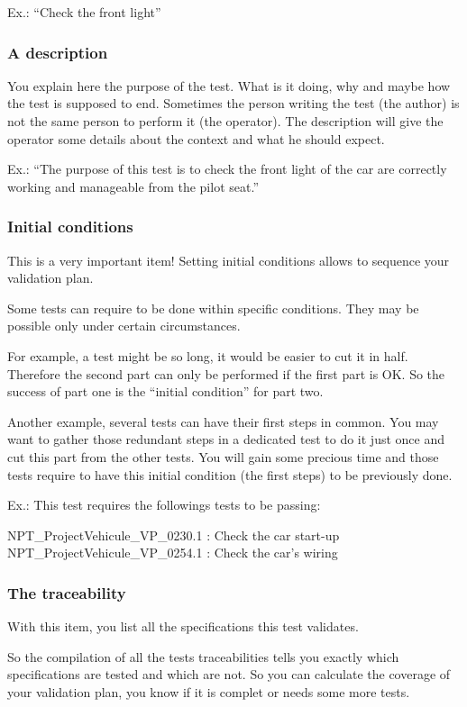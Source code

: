 Ex.: “Check the front light”

\subsubsection{A description}
You explain here the purpose of the test. What is it doing, why and maybe how the test is supposed to end. Sometimes the person writing the test (the author) is not the same person to perform it (the operator). The description will give the operator some details about the context and what he should expect.

Ex.: “The purpose of this test is to check the front light of the car are correctly working and manageable from the pilot seat.”

\subsubsection{Initial conditions}
This is a very important item! Setting initial conditions allows to sequence your validation plan.

Some tests can require to be done within specific conditions. They may be possible only under certain circumstances.

For example, a test might be so long, it would be easier to cut it in half. Therefore the second part can only be performed if the first part is OK. So the success of part one is the “initial condition” for part two.

Another example, several tests can have their first steps in common. You may want to gather those redundant steps in a dedicated test to do it just once and cut this part from the other tests. You will gain some precious time and those tests require to have this initial condition (the first steps) to be previously done.

Ex.: This test requires the followings tests to be passing:

NPT\_ProjectVehicule\_VP\_0230.1 : Check the car start-up\\
NPT\_ProjectVehicule\_VP\_0254.1 : Check the car’s wiring

\subsubsection{The traceability}
With this item, you list all the specifications this test validates.

So the compilation of all the tests traceabilities tells you exactly which specifications are tested and which are not. So you can calculate the coverage of your validation plan, you know if it is complet or needs some more tests.

